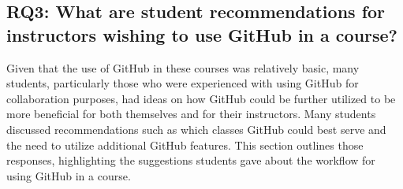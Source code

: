 
\subsection{RQ3: What are student recommendations for instructors wishing to use GitHub in a course?}

Given that the use of GitHub in these courses was relatively basic, many students, particularly those who were experienced with using GitHub for collaboration purposes, had ideas on how GitHub could be further utilized to be more beneficial for both themselves and for their instructors. Many students discussed recommendations such as which classes GitHub could best serve and the need to utilize additional GitHub features. This section outlines those responses, highlighting the suggestions students gave about the workflow for using GitHub in a course. \\


